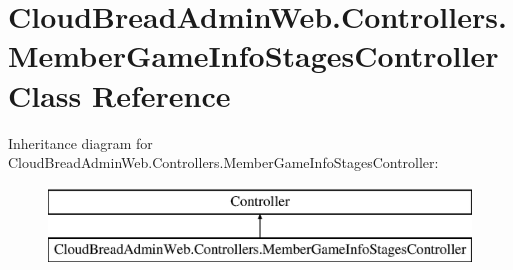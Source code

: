 \hypertarget{class_cloud_bread_admin_web_1_1_controllers_1_1_member_game_info_stages_controller}{}\section{Cloud\+Bread\+Admin\+Web.\+Controllers.\+Member\+Game\+Info\+Stages\+Controller Class Reference}
\label{class_cloud_bread_admin_web_1_1_controllers_1_1_member_game_info_stages_controller}
Inheritance diagram for Cloud\+Bread\+Admin\+Web.\+Controllers.\+Member\+Game\+Info\+Stages\+Controller\+:\begin{figure}[H]
\begin{center}
\leavevmode
\includegraphics[height=2.000000cm]{class_cloud_bread_admin_web_1_1_controllers_1_1_member_game_info_stages_controller}
\end{center}
\end{figure}
